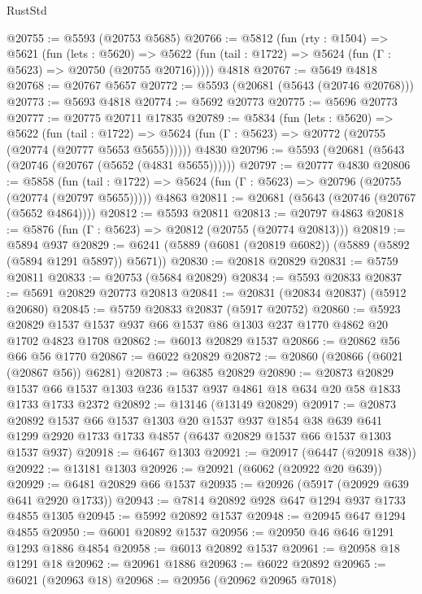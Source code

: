 \begin{lexlean}{RustStd}
\begin{coremodule}
@20755 := @5593 (@20753 @5685)
@20766 := @5812
    (fun (rty : @1504) =>
    @5621
      (fun (lets : @5620) =>
      @5622 (fun (tail : @1722) => @5624 (fun (Γ : @5623) => @20750 (@20755 @20716)))))
    @4818
@20767 := @5649 @4818
@20768 := @20767 @5657
@20772 := @5593 (@20681 (@5643 (@20746 @20768)))
@20773 := @5693 @4818
@20774 := @5692 @20773
@20775 := @5696 @20773
@20777 := @20775 @20711 @17835
@20789 := @5834
    (fun (lets : @5620) =>
    @5622
      (fun (tail : @1722) =>
      @5624 (fun (Γ : @5623) => @20772 (@20755 (@20774 (@20777 @5653 @5655))))))
    @4830
@20796 := @5593 (@20681 (@5643 (@20746 (@20767 (@5652 (@4831 @5655))))))
@20797 := @20777 @4830
@20806 := @5858
    (fun (tail : @1722) => @5624 (fun (Γ : @5623) => @20796 (@20755 (@20774 (@20797 @5655)))))
    @4863
@20811 := @20681 (@5643 (@20746 (@20767 (@5652 @4864))))
@20812 := @5593 @20811
@20813 := @20797 @4863
@20818 := @5876 (fun (Γ : @5623) => @20812 (@20755 (@20774 @20813)))
@20819 := @5894 @937
@20829 := @6241 (@5889 (@6081 (@20819 @6082)) (@5889 (@5892 (@5894 @1291 @5897)) @5671))
@20830 := @20818 @20829
@20831 := @5759 @20811
@20833 := @20753 (@5684 @20829)
@20834 := @5593 @20833
@20837 := @5691 @20829 @20773 @20813
@20841 := @20831 (@20834 @20837) (@5912 @20680)
@20845 := @5759 @20833 @20837 (@5917 @20752)
@20860 := @5923 @20829 @1537 @1537 @937 @66 @1537 @86 @1303 @237 @1770 @4862 @20 @1702 @4823 @1708
@20862 := @6013 @20829 @1537
@20866 := @20862 @56 @66 @56 @1770
@20867 := @6022 @20829
@20872 := @20860 (@20866 (@6021 (@20867 @56)) @6281)
@20873 := @6385 @20829
@20890 := @20873
    @20829
    @1537
    @66
    @1537
    @1303
    @236
    @1537
    @937
    @4861
    @18
    @634
    @20
    @58
    @1833
    @1733
    @1733
    @2372
@20892 := @13146 (@13149 @20829)
@20917 := @20873
    @20892
    @1537
    @66
    @1537
    @1303
    @20
    @1537
    @937
    @1854
    @38
    @639
    @641
    @1299
    @2920
    @1733
    @1733
    @4857
    (@6437 @20829 @1537 @66 @1537 @1303 @1537 @937)
@20918 := @6467 @1303
@20921 := @20917 (@6447 (@20918 @38))
@20922 := @13181 @1303
@20926 := @20921 (@6062 (@20922 @20 @639))
@20929 := @6481 @20829 @66 @1537
@20935 := @20926 (@5917 (@20929 @639 @641 @2920 @1733))
@20943 := @7814 @20892 @928 @647 @1294 @937 @1733 @4855 @1305
@20945 := @5992 @20892 @1537
@20948 := @20945 @647 @1294 @4855
@20950 := @6001 @20892 @1537
@20956 := @20950 @46 @646 @1291 @1293 @1886 @4854
@20958 := @6013 @20892 @1537
@20961 := @20958 @18 @1291 @18
@20962 := @20961 @1886
@20963 := @6022 @20892
@20965 := @6021 (@20963 @18)
@20968 := @20956 (@20962 @20965 @7018)

\end{coremodule}
\end{lexlean}
